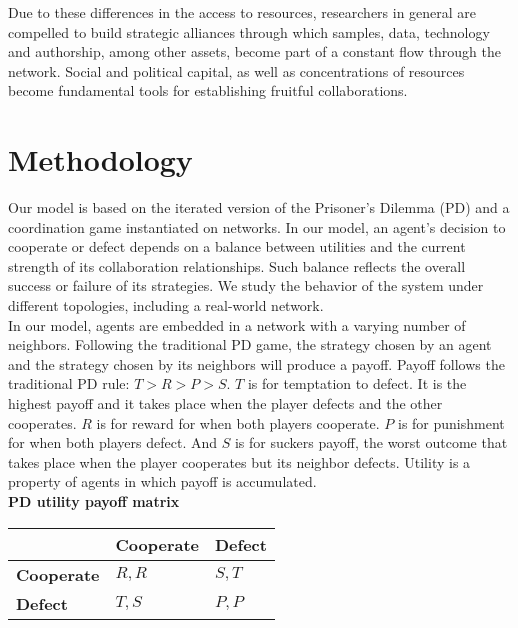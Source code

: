\documentclass{bmcart}
\begin{document}
Due to these differences in the access to resources, researchers in
general are compelled to build strategic alliances through which samples, data,
technology and authorship, among other assets, become part of a constant flow through
the network. Social and political capital, as well as concentrations of
resources become fundamental tools for establishing fruitful collaborations. 

\section*{Methodology}

Our model is based on the iterated version of the Prisoner's Dilemma (PD) and a
coordination game instantiated on networks. In our model, an agent's decision to
cooperate or defect depends on a balance between utilities and the current
strength of its collaboration relationships. Such balance reflects the overall
success or failure of its strategies. We study the behavior of the system under
different topologies, including a real-world network.\\

In our model, agents are embedded in a network with a varying number of
neighbors. Following the traditional PD game, the strategy chosen by an agent
and the strategy chosen by its neighbors will produce a payoff. Payoff follows
the traditional PD rule: $T > R > P > S$. $T$ is for temptation to defect. It is the highest
payoff and it takes place when the player defects and the other cooperates. $R$
is for reward for when both players cooperate. $P$ is for punishment for when
both players defect. And $S$ is for suckers payoff, the worst outcome that
takes place when the player cooperates but its neighbor defects. Utility is a
property of agents in which payoff is accumulated.\\   

{\bf PD utility payoff matrix}\\

\begin{tabular}{| l | l | l |}
\hline
          & \bf{Cooperate} & \bf{Defect} \\ \hline
\bf{Cooperate} &  $R,R$      &  $S,T$   \\ \hline
\bf{Defect}    &  $T,S$      &  $P,P$   \\ \hline

\end{tabular}\\ \\
\end{document}
